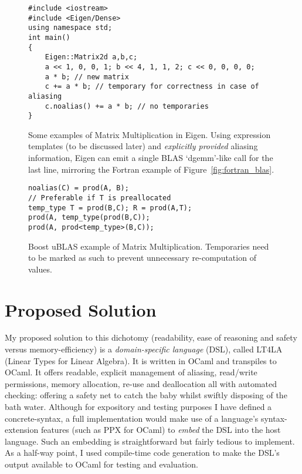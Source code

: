 \begin{figure}[tp]
    \begin{verbatim}
#include <iostream>
#include <Eigen/Dense>
using namespace std;
int main()
{
    Eigen::Matrix2d a,b,c;
    a << 1, 0, 0, 1; b << 4, 1, 1, 2; c << 0, 0, 0, 0;
    a * b; // new matrix
    c += a * b; // temporary for correctness in case of aliasing
    c.noalias() += a * b; // no temporaries
}
    \end{verbatim}
    \caption{Some examples of Matrix Multiplication in Eigen. Using expression
        templates (to be discussed later) and \emph{explicitly provided} aliasing
        information, Eigen can emit a single BLAS `dgemm'-like call for the last
	line, mirroring the Fortran example of
	Figure~\ref{fig:fortran_blas}.}\label{fig:cpp_eigen}
\end{figure}

\begin{figure}[tbp]
    \begin{verbatim}
noalias(C) = prod(A, B);
// Preferable if T is preallocated
temp_type T = prod(B,C); R = prod(A,T);
prod(A, temp_type(prod(B,C));
prod(A, prod<temp_type>(B,C));
    \end{verbatim}
    \caption{Boost uBLAS example of Matrix Multiplication. Temporaries need to
        be marked as such to prevent unnecessary re-computation of
        values.}\label{fig:cpp_ublas}
\end{figure}

\section{Proposed Solution}\label{sec:prop_sol}

My proposed solution to this dichotomy (readability, ease of reasoning and
safety versus memory-efficiency) is a \emph{domain-specific language} (DSL),
called LT4LA (Linear Types for Linear Algebra). It is written in OCaml and
transpiles to OCaml. It offers readable, explicit management of aliasing,
read/write permissions, memory allocation, re-use and deallocation all with
automated checking: offering a safety net to catch the baby whilst swiftly
disposing of the bath water.  Although for expository and testing purposes I
have defined a concrete-syntax, a full implementation would make use of a
language's syntax-extension features (such as PPX for OCaml) to \emph{embed}
the DSL into the host language. Such an embedding is straightforward but fairly
tedious to implement. As a half-way point, I used compile-time code generation
to make the DSL's output available to OCaml for testing and evaluation.

